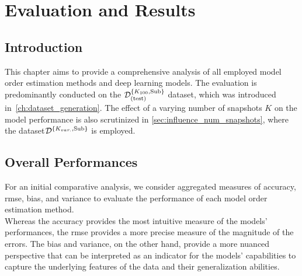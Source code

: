 \chapter{Evaluation and Results}
\label{ch:evaluation_results}

\section{Introduction}
This chapter aims to provide a comprehensive analysis of all employed model order estimation methods and deep learning models.
The evaluation is predominantly conducted on the \( \mathcal{D}^{\{K_{100},\text{Sub}\}}_{(\text{test})} \) dataset, which was introduced in~\autoref{ch:dataset_generation}.
The effect of a varying number of snapshots \( K \) on the model performance is also scrutinized in \autoref{sec:influence_num_snapshots}, where
the dataset\( \mathcal{D}^{\{K_{var.},\text{Sub}\}} \) is employed.


\section{Overall Performances}
For an initial comparative analysis, we consider aggregated measures of accuracy, \gls{rmse}, bias, and variance to
evaluate the performance of each model order estimation method. \\
Whereas the accuracy provides the most intuitive measure of the models' performances, the \gls{rmse} provides a more
precise measure of the magnitude of the errors. The bias and variance, on the other hand, provide a more nuanced perspective
that can be interpreted as an indicator for the models' capabilities to capture the underlying features of the data and
their generalization abilities.

